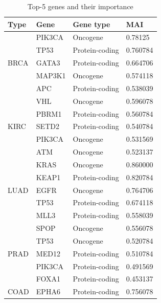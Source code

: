 \begin{table}
    \caption{Top-5 genes and their importance}
    \label{table:proteinimportance} %
    \begin{center}
    \scriptsize
    \vspace{-6mm}
    \begin{tabular}{l|l|l|l}
        \toprule
        \textbf{Type} & \textbf{Gene} & \textbf{Gene type} & \textbf{MAI} \\ \midrule
        \multirow{5}{*}{BRCA} & PIK3CA & Oncogene & 0.78125 \\ %
        & TP53 & Protein-coding & 0.760784 \\ %
        & GATA3  & Protein-coding & 0.664706 \\ %
        & MAP3K1  & Oncogene & 0.574118 \\ %
        & APC   & Protein-coding & 0.538039 \\ \midrule
        \multirow{5}{*}{KIRC} & VHL & Oncogene & 0.596078 \\ %
        & PBRM1 & Protein-coding  & 0.560784 \\ %
        & SETD2 & Protein-coding & 0.540784 \\ %
        & PIK3CA & Oncogene & 0.531569 \\ %
        & ATM & Oncogene & 0.523137 \\ %
        \midrule
        \multirow{5}{*}{LUAD}& KRAS & Oncogene & 0.860000 \\ %
        & KEAP1 & Protein-coding & 0.820784 \\ %
        & EGFR & Oncogene & 0.764706 \\ %
        & TP53 & Protein-coding & 0.674118 \\ %
        & MLL3 & Protein-coding & 0.558039 \\ %
        \midrule
        \multirow{5}{*}{PRAD}& SPOP & Oncogene & 0.556078 \\ %
        & TP53 & Oncogene & 0.520784 \\ %
        & MED12 & Protein-coding & 0.510784 \\ %
        & PIK3CA & Protein-coding & 0.491569 \\ %
        & FOXA1 & Protein-coding & 0.453137 \\ %
        \midrule
        \multirow{5}{*}{COAD}& EPHA6 & Protein-coding & 0.756078 \\ %

\end{tabular}
\end{center}
\end{table}
